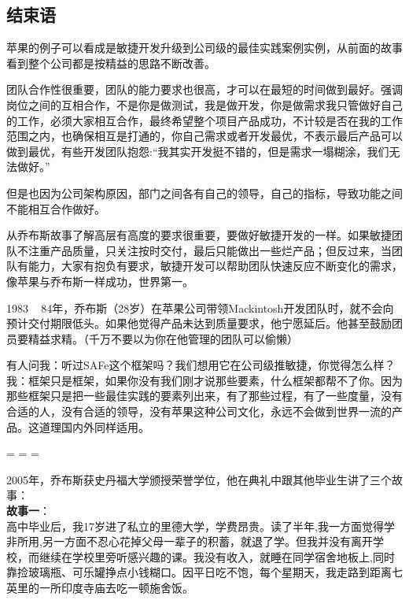 \hypertarget{ux7ed3ux675fux8bed}{%
\subsection{结束语}\label{ux7ed3ux675fux8bed}}

苹果的例子可以看成是敏捷开发升级到公司级的最佳实践案例实例，从前面的故事看到整个公司都是按精益的思路不断改善。

团队合作性很重要，团队的能力要求也很高，才可以在最短的时间做到最好。强调岗位之间的互相合作，不是你是做测试，我是做开发，你是做需求我只管做好自己的工作，必须大家相互合作，最终希望整个项目产品成功，不计较是否在我的工作范围之内，也确保相互是打通的，你自己需求或者开发最优，不表示最后产品可以做到最优，有些开发团队抱怨:“我其实开发挺不错的，但是需求一塌糊涂，我们无法做好。”

但是也因为公司架构原因，部门之间各有自己的领导，自己的指标，导致功能之间不能相互合作做好。

从乔布斯故事了解高层有高度的要求很重要，要做好敏捷开发的一样。如果敏捷团队不注重产品质量，只关注按时交付，最后只能做出一些烂产品；但反过来，当团队有能力，大家有抱负有要求，敏捷开发可以帮助团队快速反应不断变化的需求，像苹果与乔布斯一样成功，世界第一。

1983 ~ 
84年，乔布斯（28岁）在苹果公司带领Mackintosh开发团队时，就不会向预计交付期限低头。如果他觉得产品未达到质量要求，他宁愿延后。他甚至鼓励团员要精益求精。（千万不要以为你在他管理的团队可以偷懒）

有人问我：听过SAFe这个框架吗？我们想用它在公司级推敏捷，你觉得怎么样？
我：框架只是框架，如果你没有我们刚才说那些要素，什么框架都帮不了你。因为那些框架只是把一些最佳实践的要素列出来，有了那些过程，有了一些度量，没有合适的人，没有合适的领导，没有苹果这种公司文化，永远不会做到世界一流的产品。这道理国内外同样适用。

\begin{description}
\tightlist
\item[]
= = =
\end{description}

2005年，乔布斯获史丹福大学颁授荣誉学位，他在典礼中跟其他毕业生讲了三个故事：\\
\textbf{故事一}：\\
高中毕业后，我17岁进了私立的里德大学，学费昂贵。读了半年,我一方面觉得学非所用,另一方面不忍心花掉父母一辈子的积蓄，就退了学。但我并没有离开学校，而继续在学校里旁听感兴趣的课。我没有收入，就睡在同学宿舍地板上,同时靠捡玻璃瓶、可乐罐挣点小钱糊口。因平日吃不饱，每个星期天，我走路到距离七英里的一所印度寺庙去吃一顿施舍饭。

